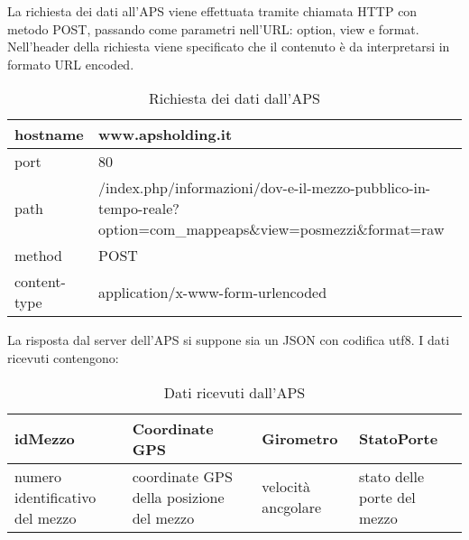  \label{app:aps}

La richiesta dei dati all'APS viene effettuata tramite chiamata HTTP con metodo POST, passando come parametri nell'URL: option, view e format.
Nell'header della richiesta viene specificato che il contenuto è da interpretarsi in formato URL encoded.

\begin{table}[H]
	\centering
	\begin{tabu}{| X[0.5] | X |}
		\hline
		hostname & www.apsholding.it \\ \hline 
		port & 80 \\ \hline
		path & /index.php/informazioni/dov-e-il-mezzo-pubblico-in-tempo-reale?option=com\_mappeaps\&view=posmezzi\&format=raw  \\ \hline
		method & POST \\ \hline 
		content-type & application/x-www-form-urlencoded \\ \hline
	\end{tabu}
	\caption{Richiesta dei dati dall'APS}
\end{table}

La risposta dal server dell'APS si suppone sia un JSON con codifica utf8. I dati ricevuti contengono:

\begin{table}[H]
	\centering
	\begin{tabu}{| X | X | X | X |}
		\hline
		idMezzo & Coordinate GPS & Girometro & StatoPorte \\ \hline
		numero identificativo del mezzo & coordinate GPS della posizione del mezzo & velocità ancgolare & stato delle porte del mezzo \\ \hline
		\end{tabu}
	\caption{Dati ricevuti dall'APS}
\end{table}